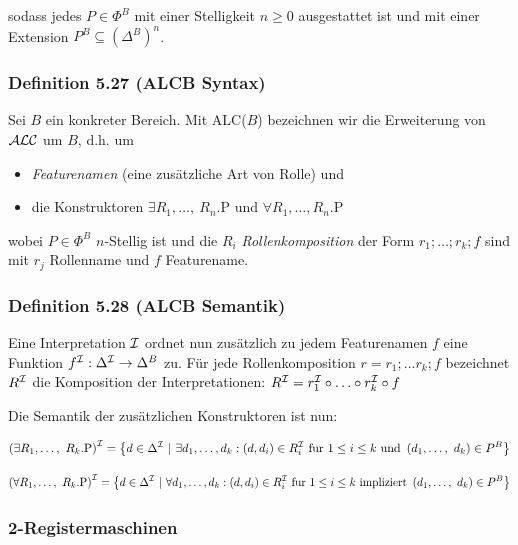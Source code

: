 sodass jedes $P \in \Phi^{B}$ mit einer Stelligkeit $n \geq 0$
ausgestattet ist und mit einer Extension
$P^{B} \subseteq \left( \Delta^{B} \right)^{n}$.

\subsubsection{Definition 5.27 (ALCB
Syntax)}\label{definition-5.27-alcb-syntax}

Sei $B$ ein konkreter Bereich. Mit ALC($B$) bezeichnen wir die
Erweiterung von $\mathcal{A}\mathcal{L}\mathcal{C}$ um $B$, d.h. um

\begin{itemize}
\item
  \emph{Featurenamen} (eine zusätzliche Art von Rolle) und
\item
  die Konstruktoren $\exists R_{1},\ldots,\ R_{n}\text{.P}$ und
  $\forall R_{1},\ldots,R_{n}\text{.P}$
\end{itemize}

wobei $P \in \Phi^{B}$ $n$-Stellig ist und die $R_{i}$
\emph{Rollenkomposition} der Form $r_{1};\ldots;r_{k};f$ sind mit
$r_{j}$ Rollenname und $f$ Featurename.

\subsubsection{Definition 5.28 (ALCB
Semantik)}\label{definition-5.28-alcb-semantik}

Eine Interpretation $\mathcal{I}$ ordnet nun zusätzlich zu jedem Featurenamen
$f$ eine Funktion $f^{\mathcal{I}}:\Delta^{\mathcal{I}} \rightarrow \Delta^{B}$ zu. Für
jede Rollenkomposition $r = r_{1};\ldots r_{k};f$ bezeichnet $R^{\mathcal{I}}$
die Komposition der Interpretationen:
$R^{\mathcal{I}} = r_{1}^{\mathcal{I}} \circ \ldots \circ r_{k}^{\mathcal{I}} \circ f$

Die Semantik der zusätzlichen Konstruktoren ist nun:

\[\left( \exists R_{1},\ldots,\ R_{k}\text{.P} \right)^{\MI} = \left\{ d \in \Delta^{\MI}\ |\ \exists d_{1},\ldots,d_{k}:\left( d,d_{i} \right) \in R_{i}^{\MI}\ \mathrm{fur}\ 1 \leq i \leq k\ \mathrm{\text{und}}\ \left( d_{1},\ldots,\ d_{k} \right) \in P^{B} \right\}\]

\[\left( \forall R_{1},\ldots,\ R_{k}\text{.P} \right)^{\MI} = \left\{ d \in \Delta^{\MI}\ |\ \forall d_{1},\ldots,d_{k}:\left( d,d_{i} \right) \in R_{i}^{\MI}\ \mathrm{fur}\ 1 \leq i \leq k\ \mathrm{\text{impliziert}}\ \left( d_{1},\ldots,\ d_{k} \right) \in P^{B} \right\}\]

\subsubsection{2-Registermaschinen}\label{registermaschinen}

